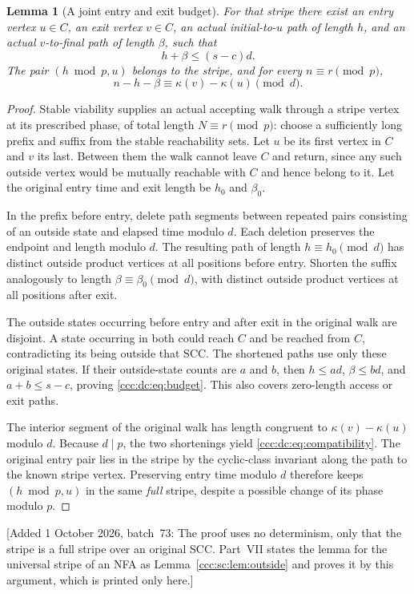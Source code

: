 \documentclass[11pt,letterpaper]{article}
\newtheorem{lemma}[theorem]{Lemma}
\theoremstyle{definition}
\theoremstyle{remark}
\newcommand{\waddsevthree}[1]{\textup{[}Added 1 October 2026, batch~73: #1\textup{]}}
\begin{document}
\begin{lemma}[A joint entry and exit budget]\label{ccc:dc:lem:budget}
For that stripe there exist an entry vertex $u\in C$, an exit vertex $v\in C$, an actual initial-to-$u$ path of length $h$, and an actual $v$-to-final path of length $\beta$, such that
\begin{equation}\label{ccc:dc:eq:budget}
h+\beta\le(s-c)d.
\end{equation}
The pair $(h\bmod p,u)$ belongs to the stripe, and for every $n\equiv r\pmod p$,
\begin{equation}\label{ccc:dc:eq:compatibility}
n-h-\beta\equiv\kappa(v)-\kappa(u)\pmod d.
\end{equation}
\end{lemma}
\begin{proof}
Stable viability supplies an actual accepting walk through a stripe vertex at its prescribed phase, of total length $N\equiv r\pmod p$: choose a sufficiently long prefix and suffix from the stable reachability sets. Let $u$ be its first vertex in $C$ and $v$ its last. Between them the walk cannot leave $C$ and return, since any such outside vertex would be mutually reachable with $C$ and hence belong to it. Let the original entry time and exit length be $h_0$ and $\beta_0$.

In the prefix before entry, delete path segments between repeated pairs consisting of an outside state and elapsed time modulo $d$. Each deletion preserves the endpoint and length modulo $d$. The resulting path of length $h\equiv h_0\pmod d$ has distinct outside product vertices at all positions before entry. Shorten the suffix analogously to length $\beta\equiv\beta_0\pmod d$, with distinct outside product vertices at all positions after exit.

The outside states occurring before entry and after exit in the original walk are disjoint. A state occurring in both could reach $C$ and be reached from $C$, contradicting its being outside that SCC. The shortened paths use only these original states. If their outside-state counts are $a$ and $b$, then $h\le ad$, $\beta\le bd$, and $a+b\le s-c$, proving \eqref{ccc:dc:eq:budget}. This also covers zero-length access or exit paths.

The interior segment of the original walk has length congruent to $\kappa(v)-\kappa(u)$ modulo $d$. Because $d\mid p$, the two shortenings yield \eqref{ccc:dc:eq:compatibility}. The original entry pair lies in the stripe by the cyclic-class invariant along the path to the known stripe vertex. Preserving entry time modulo $d$ therefore keeps $(h\bmod p,u)$ in the same \emph{full} stripe, despite a possible change of its phase modulo $p$.
\end{proof}
\waddsevthree{The proof uses no determinism, only that the stripe is a full
stripe over an original SCC. Part~VII states the lemma for the universal
stripe of an NFA as Lemma~\ref{ccc:sc:lem:outside} and proves it by this
argument, which is printed only here.}
\end{document}
